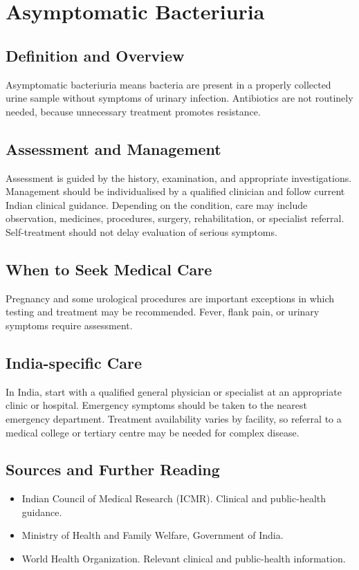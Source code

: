 \chapter{Asymptomatic Bacteriuria}

\section*{Definition and Overview}
Asymptomatic bacteriuria means bacteria are present in a properly collected urine sample without symptoms of urinary infection. Antibiotics are not routinely needed, because unnecessary treatment promotes resistance.

\section*{Assessment and Management}
Assessment is guided by the history, examination, and appropriate investigations. Management should be individualised by a qualified clinician and follow current Indian clinical guidance. Depending on the condition, care may include observation, medicines, procedures, surgery, rehabilitation, or specialist referral. Self-treatment should not delay evaluation of serious symptoms.

\section*{When to Seek Medical Care}
Pregnancy and some urological procedures are important exceptions in which testing and treatment may be recommended. Fever, flank pain, or urinary symptoms require assessment.

\section*{India-specific Care}
In India, start with a qualified general physician or specialist at an appropriate clinic or hospital. Emergency symptoms should be taken to the nearest emergency department. Treatment availability varies by facility, so referral to a medical college or tertiary centre may be needed for complex disease.

\section*{Sources and Further Reading}
\begin{itemize}
    \item Indian Council of Medical Research (ICMR). Clinical and public-health guidance.
    \item Ministry of Health and Family Welfare, Government of India.
    \item World Health Organization. Relevant clinical and public-health information.
\end{itemize}

